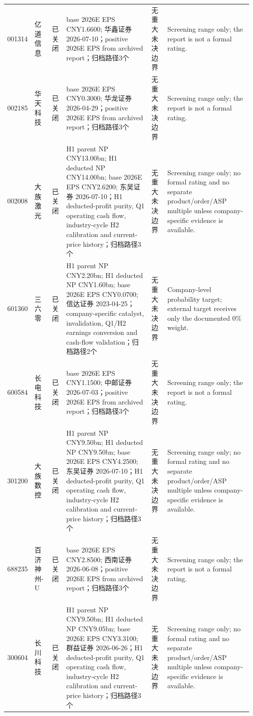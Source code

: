 \begin{longtable}{L{1.00cm}L{1.40cm}L{1.45cm}L{2.85cm}L{2.50cm}L{3.05cm}}
001314 & 亿道信息 & 已关闭 & base 2026E EPS CNY1.6600; 华鑫证券 2026-07-10；positive 2026E EPS from archived report；归档路径3个 & 无重大未决边界 & Screening range only; the report is not a formal rating. \\
002185 & 华天科技 & 已关闭 & base 2026E EPS CNY0.3000; 华龙证券 2026-04-29；positive 2026E EPS from archived report；归档路径3个 & 无重大未决边界 & Screening range only; the report is not a formal rating. \\
002008 & 大族激光 & 已关闭 & H1 parent NP CNY13.00bn; H1 deducted NP CNY14.00bn; base 2026E EPS CNY2.6200; 东吴证券 2026-07-10；H1 deducted-profit purity, Q1 operating cash flow, industry-cycle H2 calibration and current-price history；归档路径3个 & 无重大未决边界 & Screening range only; no formal rating and no separate product/order/ASP multiple unless company-specific evidence is available. \\
601360 & 三六零 & 已关闭 & H1 parent NP CNY2.20bn; H1 deducted NP CNY1.60bn; base 2026E EPS CNY0.0700; 信达证券 2023-04-25；company-specific catalyst, invalidation, Q1/H2 earnings conversion and cash-flow validation；归档路径2个 & 无重大未决边界 & Company-level probability target; external target receives only the documented 0\% weight. \\
600584 & 长电科技 & 已关闭 & base 2026E EPS CNY1.1500; 中邮证券 2026-07-03；positive 2026E EPS from archived report；归档路径3个 & 无重大未决边界 & Screening range only; the report is not a formal rating. \\
301200 & 大族数控 & 已关闭 & H1 parent NP CNY9.50bn; H1 deducted NP CNY9.50bn; base 2026E EPS CNY4.2500; 东吴证券 2026-07-10；H1 deducted-profit purity, Q1 operating cash flow, industry-cycle H2 calibration and current-price history；归档路径3个 & 无重大未决边界 & Screening range only; no formal rating and no separate product/order/ASP multiple unless company-specific evidence is available. \\
688235 & 百济神州-U & 已关闭 & base 2026E EPS CNY2.8500; 西南证券 2026-06-08；positive 2026E EPS from archived report；归档路径3个 & 无重大未决边界 & Screening range only; the report is not a formal rating. \\
300604 & 长川科技 & 已关闭 & H1 parent NP CNY9.50bn; H1 deducted NP CNY9.05bn; base 2026E EPS CNY3.3100; 群益证券 2026-06-26；H1 deducted-profit purity, Q1 operating cash flow, industry-cycle H2 calibration and current-price history；归档路径3个 & 无重大未决边界 & Screening range only; no formal rating and no separate product/order/ASP multiple unless company-specific evidence is available. \\

\end{longtable}
